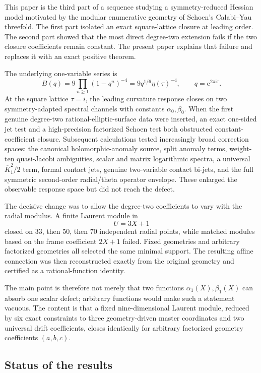 \documentclass[11pt]{article}
\theoremstyle{definition}
\theoremstyle{remark}
\newcommand{\ii}{\mathrm{i}}
\newcommand{\e}{\mathrm{e}}
\newcommand{\bK}{\overline{K}}
\begin{document}
This paper is the third part of a sequence studying a symmetry-reduced Hessian model motivated by the modular enumerative geometry of Schoen's Calabi--Yau threefold.  The first part isolated an exact square-lattice closure at leading order.  The second part showed that the most direct degree-two extension fails if the two closure coefficients remain constant.  The present paper explains that failure and replaces it with an exact positive theorem.

The underlying one-variable series is
\begin{equation}\label{eq:Bdef}
 B(q)=9\prod_{n\ge1}(1-q^n)^{-4}
     =9q^{1/6}\eta(\tau)^{-4},
 \qquad q=\e^{2\pi\ii\tau}.
\end{equation}
At the square lattice $\tau=i$, the leading curvature response closes on two symmetry-adapted spectral channels with constants $\alpha_0,\beta_0$.  When the first genuine degree-two rational-elliptic-surface data were inserted, an exact one-sided jet test and a high-precision factorized Schoen test both obstructed constant-coefficient closure.  Subsequent calculations tested increasingly broad correction spaces: the canonical holomorphic-anomaly source, split anomaly terms, weight-ten quasi-Jacobi ambiguities, scalar and matrix logarithmic spectra, a universal $\bK_1^2/2$ term, formal contact jets, genuine two-variable contact bi-jets, and the full symmetric second-order radial/theta operator envelope.  These enlarged the observable response space but did not reach the defect.

The decisive change was to allow the degree-two coefficients to vary with the radial modulus.  A finite Laurent module in
\[
 U=3X+1
\]
closed on $33$, then $50$, then $70$ independent radial points, while matched modules based on the frame coefficient $2X+1$ failed.  Fixed geometries and arbitrary factorized geometries all selected the same minimal support.  The resulting affine connection was then reconstructed exactly from the original geometry and certified as a rational-function identity.

The main point is therefore not merely that two functions $\alpha_1(X),\beta_1(X)$ can absorb one scalar defect; arbitrary functions would make such a statement vacuous.  The content is that a fixed nine-dimensional Laurent module, reduced by six exact constraints to three geometry-driven master coordinates and two universal drift coefficients, closes identically for arbitrary factorized geometry coefficients $(a,b,c)$.

\subsection*{Status of the results}
\end{document}
